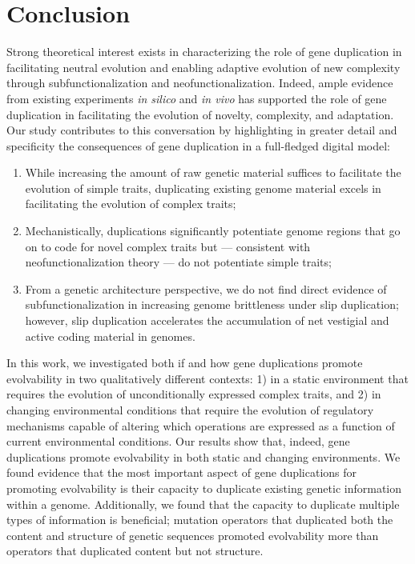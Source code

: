 \section{Conclusion} \label{sec:conclusion}

Strong theoretical interest exists in characterizing the role of gene duplication in facilitating neutral evolution and enabling adaptive evolution of new complexity through subfunctionalization and neofunctionalization.
Indeed, ample evidence from existing experiments \textit{in silico} and \textit{in vivo} has supported the role of gene duplication in facilitating the evolution of novelty, complexity, and adaptation.
Our study contributes to this conversation by highlighting in greater detail and specificity the consequences of gene duplication in a full-fledged digital model:
\begin{enumerate}
\item While increasing the amount of raw genetic material suffices to facilitate the evolution of simple traits, duplicating existing genome material excels in facilitating the evolution of complex traits;
\item Mechanistically, duplications significantly potentiate genome regions that go on to code for novel complex traits but --- consistent with neofunctionalization theory --- do not potentiate simple traits;
\item From a genetic architecture perspective, we do not find direct evidence of subfunctionalization in increasing genome brittleness under slip duplication; however, slip duplication accelerates the accumulation of net vestigial and active coding material in genomes.
\end{enumerate}

In this work, we investigated both if and how gene duplications promote evolvability in two qualitatively different contexts: 1) in a static environment that requires the evolution of unconditionally expressed complex traits, and 2) in changing environmental conditions that require the evolution of regulatory mechanisms capable of altering which operations are expressed as a function of current environmental conditions. %
Our results show that, indeed, gene duplications promote evolvability in both static and changing environments. We found evidence that the most important aspect of gene duplications for promoting evolvability is their capacity to duplicate existing genetic information within a genome.
Additionally, we found that the capacity to duplicate multiple types of information is beneficial; mutation operators that duplicated both the content and structure of genetic sequences promoted evolvability more than operators that duplicated content but not structure.

